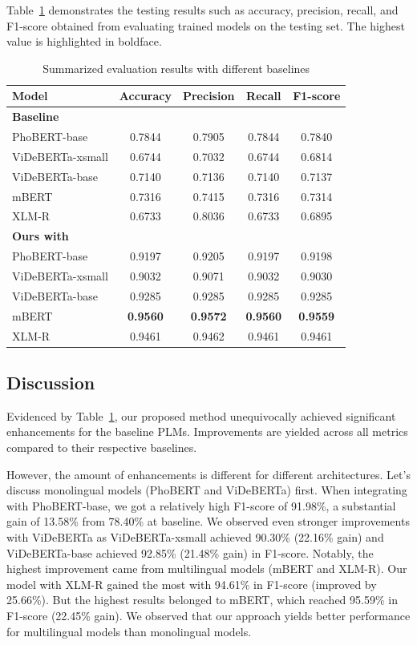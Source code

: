 \documentclass{llncs}
\begin{document}
Table~\ref{tab:test-summary} demonstrates the testing results such as accuracy, precision, recall, and F1-score obtained from evaluating trained models on the testing set. The highest value is highlighted in boldface.
\begin{table}[H]
\centering
\caption{Summarized evaluation results with different baselines}
\label{tab:test-summary}
\begin{tabular}{lcccc}
\toprule
\textbf{Model} & \textbf{Accuracy} & \textbf{Precision} & \textbf{Recall} & \textbf{F1-score} \\
\midrule
\textbf{Baseline} \\
PhoBERT-base & 0.7844 & 0.7905 & 0.7844 & 0.7840 \\
ViDeBERTa-xsmall & 0.6744 & 0.7032 & 0.6744 & 0.6814 \\
ViDeBERTa-base & 0.7140 & 0.7136 & 0.7140 & 0.7137 \\
mBERT & 0.7316 & 0.7415 & 0.7316 & 0.7314 \\
XLM‑R & 0.6733 & 0.8036 & 0.6733 & 0.6895 \\
\midrule
\textbf{Ours with} \\
PhoBERT-base & 0.9197 & 0.9205 & 0.9197 & 0.9198 \\
ViDeBERTa-xsmall & 0.9032 & 0.9071 & 0.9032 & 0.9030 \\
ViDeBERTa-base & 0.9285 & 0.9285 & 0.9285 & 0.9285 \\
mBERT & \textbf{0.9560} & \textbf{0.9572} & \textbf{0.9560} & \textbf{0.9559} \\
XLM‑R & 0.9461 & 0.9462 & 0.9461 & 0.9461 \\
\bottomrule
\end{tabular}
\end{table}


\subsection{Discussion}

%
%
Evidenced by Table~\ref{tab:test-summary}, our proposed method unequivocally achieved significant enhancements for the baseline PLMs. Improvements are yielded across all metrics compared to their respective baselines.

%
%
However, the amount of enhancements is different for different architectures. Let's discuss monolingual models (PhoBERT and ViDeBERTa) first. When integrating with PhoBERT-base, we got a relatively high F1-score of 91.98\%, a substantial gain of 13.58\% from 78.40\% at baseline. We observed even stronger improvements with ViDeBERTa as ViDeBERTa-xsmall achieved 90.30\% (22.16\% gain) and ViDeBERTa-base achieved 92.85\% (21.48\% gain) in F1-score. Notably, the highest improvement came from multilingual models (mBERT and XLM-R). Our model with XLM-R gained the most with 94.61\% in F1-score (improved by 25.66\%). But the highest results belonged to mBERT, which reached 95.59\% in F1-score (22.45\% gain). We observed that our approach yields better performance for multilingual models than monolingual models.
\end{document}
